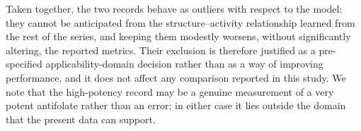 Taken together, the two records behave as outliers with respect to the model: they cannot be anticipated from the structure--activity relationship learned from the rest of the series, and keeping them modestly worsens, without significantly altering, the reported metrics. Their exclusion is therefore justified as a pre-specified applicability-domain decision rather than as a way of improving performance, and it does not affect any comparison reported in this study. We note that the high-potency record may be a genuine measurement of a very potent antifolate rather than an error; in either case it lies outside the domain that the present data can support.
